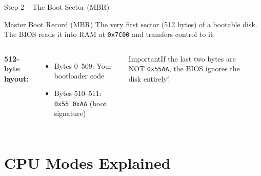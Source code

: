\documentclass[aspectratio=169]{beamer}
\newcommand{\concept}[2]{%
  \begin{block}{#1}\smallskip #2\smallskip\end{block}\vspace{5pt}}
\newcommand{\warn}[1]{%
  \begin{alertblock}{Important}\smallskip #1\smallskip\end{alertblock}\vspace{5pt}}
\begin{document}
\begin{frame}{Step 2 -- The Boot Sector (MBR)}
  \concept{Master Boot Record (MBR)}{
    The very first sector (512 bytes) of a bootable disk. The BIOS reads it into RAM at \texttt{0x7C00} and transfers control to it.
  }
  \begin{columns}[T]
    \vspace{2pt}
    \textbf{512-byte layout:}
    \begin{itemize}
      \item Bytes 0--509: Your bootloader code
      \item Bytes 510--511: \texttt{0x55 0xAA} (boot signature)
    \end{itemize}
    \vspace{8pt}
    \warn{If the last two bytes are NOT \texttt{0x55AA}, the BIOS ignores the disk entirely!}
    \vspace{6pt}
    \begin{center}
    \end{center}
  \end{columns}
\end{frame}

\section{CPU Modes Explained}
\end{document}
